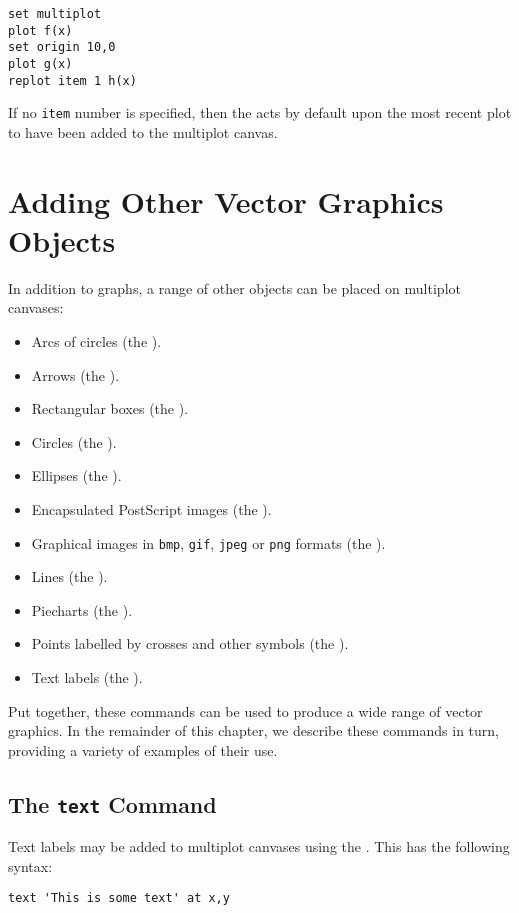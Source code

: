 \begin{verbatim}
set multiplot
plot f(x)
set origin 10,0
plot g(x)
replot item 1 h(x)
\end{verbatim}

If no {\tt item} number is specified, then the  acts by default
upon the most recent plot to have been added to the multiplot canvas.

\section{Adding Other Vector Graphics Objects}

In addition to graphs, a range of other objects can be placed on multiplot
canvases:
\begin{itemize}
\item Arcs of circles (the ).
\item Arrows (the ).
\item Rectangular boxes (the ).
\item Circles (the ).
\item Ellipses (the ).
\item Encapsulated PostScript images (the ).
\item Graphical images in {\tt bmp}, {\tt gif}, {\tt jpeg} or {\tt png} formats (the ).
\item Lines (the ).
\item Piecharts (the ).
\item Points labelled by crosses and other symbols (the ).
\item Text labels (the ).
\end{itemize}
Put together, these commands can be used to produce a wide range of vector
graphics. In the remainder of this chapter, we describe these commands in turn,
providing a variety of examples of their use.

\subsection{The {\tt text} Command}

Text labels may be added to multiplot canvases using the . This
has the following syntax:

\begin{verbatim}
text 'This is some text' at x,y
\end{verbatim}

